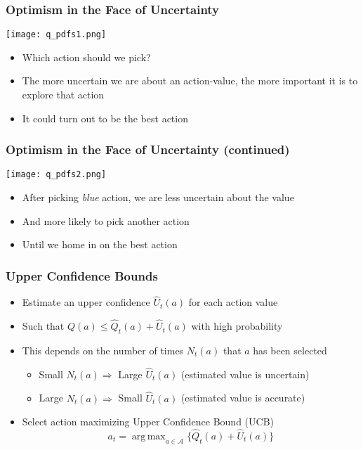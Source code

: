 \documentclass[handout]{beamer}
\DeclareMathOperator*{\argmax}{arg\,max}
\begin{document}
\begin{frame}
\frametitle{Optimism in the Face of Uncertainty}
\pause
\texttt{[image: q\_pdfs1.png]}
\begin{itemize}[<+->]
\item Which action should we pick?
\item The more uncertain we are about an action-value, the more important it is to explore that action
\item It could turn out to be the best action
\end{itemize}
\end{frame}

\begin{frame}
\frametitle{Optimism in the Face of Uncertainty (continued)}
\pause
\texttt{[image: q\_pdfs2.png]}
\begin{itemize}[<+->]
\item After picking {\em blue} action, we are less uncertain about the value
\item And more likely to pick another action
 \item Until we home in on the best action
\end{itemize}
\end{frame}



\begin{frame}
\frametitle{Upper Confidence Bounds}
\pause
\begin{itemize}[<+->]
\item Estimate an upper confidence $\hat{U}_t(a)$ for each action value
\item Such that $Q(a) \leq \hat{Q}_t(a) + \hat{U}_t(a)$ with high probability
\item This depends on the number of times $N_t(a)$ that $a$ has been selected
\begin{itemize}
\item Small $N_t(a) \Rightarrow$ Large $\hat{U}_t(a)$ (estimated value is uncertain)
\item Large $N_t(a) \Rightarrow$ Small $\hat{U}_t(a)$ (estimated value is accurate)
\end{itemize}
\item Select action maximizing Upper Confidence  Bound (UCB)
$$a_t = \argmax_{a\in\mathcal{A}} \{ \hat{Q}_t(a) + \hat{U}_t(a) \}$$
\end{itemize}
\end{frame}
\end{document}
